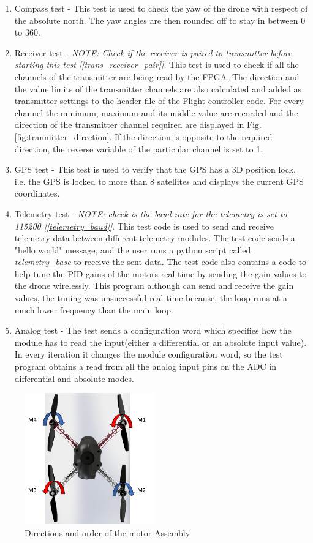 \begin{enumerate}
    \item Compass test - This test is used to check the yaw of the drone with respect of the absolute north. The yaw angles are then rounded off to stay in between 0 to 360.
     \item Receiver test - 
     \textit{NOTE: Check if the receiver is paired to transmitter before starting this test [\ref{trans_receiver_pair}]}. 
     This test is used to check if all the channels of the transmitter are being read by the FPGA. The direction and the value limits of the transmitter channels are also calculated and added as transmitter settings to the header file of the Flight controller code. For every channel the minimum, maximum and its middle value are recorded and the direction of the transmitter channel required are displayed in Fig. \ref{fig:tranmitter_direction}. If the direction is opposite to the required direction, the reverse variable of the particular channel is set to 1.
     \item GPS test - This test is used to verify that the GPS has a 3D position lock, i.e. the GPS is locked to more than 8 satellites and displays the current GPS coordinates.
     \item Telemetry test - \textit{NOTE: check is the baud rate for the telemetry is set to 115200 [\ref{telemetry_baud}]}. This test code is used to send and receive telemetry data between different telemetry modules. The test code sends a "hello world" message, and the user runs a python script called  \textit{telemetry\_base} to receive the sent data.
     The test code also contains a code to help tune the PID gains of the motors real time by sending the gain values to the drone wirelessly. This program although can send and receive the gain values, the tuning was unsuccessful real time because, the loop runs at a much lower frequency than the main loop.
     \item Analog test - The test sends a configuration word which specifies how the module has to read the input(either a differential or an absolute input value). In every iteration it changes the module configuration word, so the test program obtains a read from all the analog input pins on the ADC in differential and absolute modes.
\end{enumerate}

\begin{figure} [ht]
    \centering
    \includegraphics[width=0.5\textwidth]{Figures/testing/motor_directions.png}
    \caption{Directions and order of the motor Assembly}
    \label{fig:motor_direction}
\end{figure}

